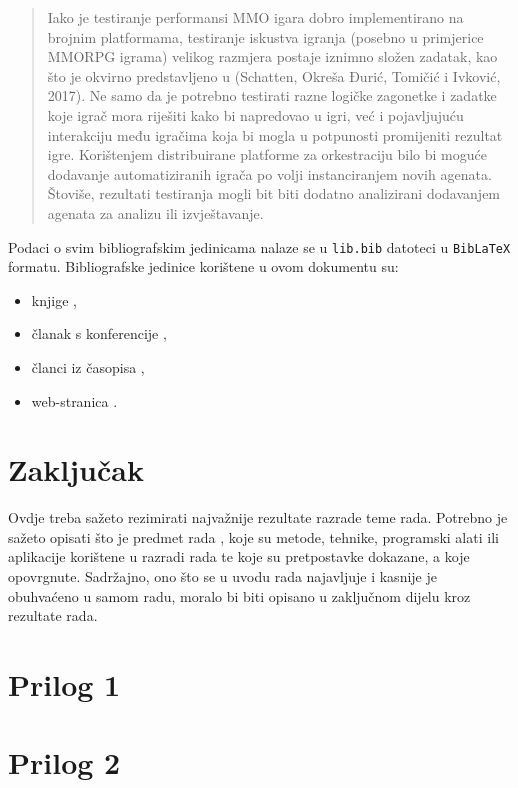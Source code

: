 \documentclass[]{foi}
\begin{document}
\blockquote[{\cite[str. 6]{schatten2020PlatformeZaOrkestraciju}}]{Iako je testiranje performansi MMO igara dobro implementirano na brojnim platformama, testiranje iskustva
	igranja (posebno u primjerice MMORPG igrama) velikog razmjera postaje iznimno složen zadatak, kao što
	je okvirno predstavljeno u (Schatten, Okreša Ðurić, Tomičić i Ivković, 2017). Ne samo da je potrebno testirati
	razne logičke zagonetke i zadatke koje igrač mora riješiti kako bi napredovao u igri, već i pojavljujuću interakciju među igračima koja bi mogla u potpunosti promijeniti rezultat igre. Korištenjem distribuirane platforme za orkestraciju bilo bi moguće dodavanje automatiziranih igrača po volji instanciranjem novih agenata. Štoviše, rezultati testiranja mogli bit biti dodatno
	analizirani dodavanjem agenata za analizu ili izvještavanje.}

Podaci o svim bibliografskim jedinicama nalaze se u \texttt{lib.bib} datoteci u \texttt{BibLaTeX} formatu. Bibliografske jedinice korištene u ovom dokumentu su:
\begin{itemize}
	\item knjige \cite{russell2022ArtificialIntelligenceModern,wooldridge2009IntroductionMultiAgentSystems,oraictolic2011AkademskoPismoStrategije},
	\item članak s konferencije \cite{okresaduric2019ModellingFormingTemporary},
	\item članci iz časopisa \cite{SchattenEtAl2016roadmap,rincon2017InfluencingPeopleSocial},
	\item web-stranica \cite{copeland2020ArtificialIntelligence}.
\end{itemize}



\chapter{Zaključak}

Ovdje treba sažeto rezimirati najvažnije rezultate razrade teme rada. Potrebno je sažeto opisati što je predmet rada \cite{copeland2020ArtificialIntelligence}, koje su metode, tehnike, programski alati ili aplikacije korištene u razradi rada te koje su pretpostavke dokazane, a koje opovrgnute. Sadržajno, ono što se u uvodu rada najavljuje i kasnije je obuhvaćeno u samom radu, moralo bi biti opisano u zaključnom dijelu kroz rezultate rada.

\lipsum[1-2]

\makebackmatter

\appendices %

\chapter{Prilog 1} %

\chapter{Prilog 2} %
\end{document}
